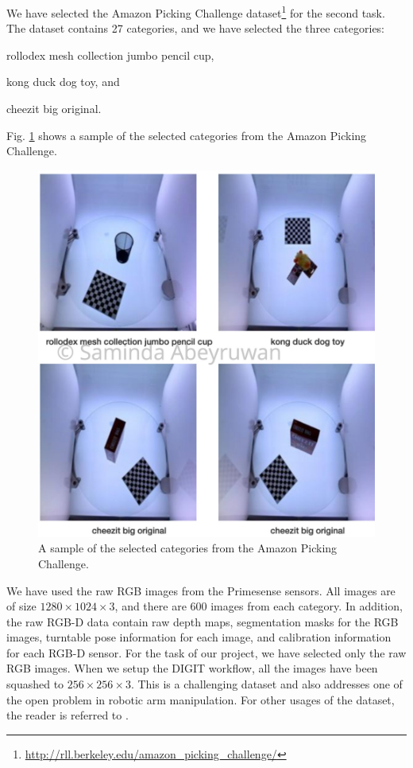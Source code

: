 \documentclass[10pt,journal,compsoc]{IEEEtran}
\begin{document}
We have selected the Amazon Picking Challenge dataset\footnote{\url{http://rll.berkeley.edu/amazon_picking_challenge/}} for the second task.  The dataset contains 27 categories, and we have selected the three categories: \begin{enumerate*}
\item rollodex mesh collection jumbo pencil cup, \item kong duck dog toy, and \item cheezit big original.
\end{enumerate*} Fig. \ref{fig:p2} shows a sample of the selected categories from the Amazon Picking Challenge.

\begin{figure}[thpb]
      \centering
      \includegraphics[width=\linewidth]{P2}
      \caption{A sample of the selected categories from the Amazon Picking Challenge.}
      \label{fig:p2}
\end{figure}

We have used the raw RGB images from the Primesense sensors. All images are of size $1280 \times 1024 \times 3$, and there are 600 images from each category.  In addition, the raw RGB-D data contain raw depth maps, segmentation masks for the RGB images, turntable pose information for each image, and calibration information for each RGB-D sensor. For the task of our project, we have selected only the raw RGB images. When we setup the DIGIT workflow, all the images have been squashed to  $256 \times 256 \times 3$. This is a challenging dataset and also addresses one of the open problem in robotic arm manipulation. For other usages of the dataset, the reader is referred to \cite{7139701}.  
\end{document}
